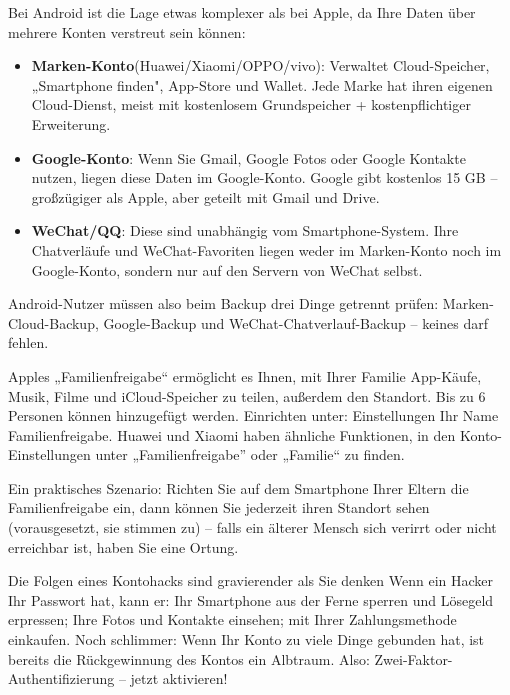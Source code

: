 
Bei Android ist die Lage etwas komplexer als bei Apple, da Ihre Daten über mehrere Konten verstreut sein können:

\begin{itemize}
  \item \textbf{Marken-Konto}(Huawei/Xiaomi/OPPO/vivo): Verwaltet Cloud-Speicher, „Smartphone finden", App-Store und Wallet. Jede Marke hat ihren eigenen Cloud-Dienst, meist mit kostenlosem Grundspeicher + kostenpflichtiger Erweiterung.
  \item \textbf{Google-Konto}: Wenn Sie Gmail, Google Fotos oder Google Kontakte nutzen, liegen diese Daten im Google-Konto. Google gibt kostenlos 15 GB – großzügiger als Apple, aber geteilt mit Gmail und Drive.
  \item \textbf{WeChat/QQ}: Diese sind unabhängig vom Smartphone-System. Ihre Chatverläufe und WeChat-Favoriten liegen weder im Marken-Konto noch im Google-Konto, sondern nur auf den Servern von WeChat selbst.
\end{itemize}

Android-Nutzer müssen also beim Backup drei Dinge getrennt prüfen: Marken-Cloud-Backup, Google-Backup und WeChat-Chatverlauf-Backup – keines darf fehlen.


Apples „Familienfreigabe“ ermöglicht es Ihnen, mit Ihrer Familie App-Käufe, Musik, Filme und iCloud-Speicher zu teilen, außerdem den Standort. Bis zu 6 Personen können hinzugefügt werden. Einrichten unter: Einstellungen Ihr Name Familienfreigabe. Huawei und Xiaomi haben ähnliche Funktionen, in den Konto-Einstellungen unter „Familienfreigabe” oder „Familie“ zu finden.

Ein praktisches Szenario: Richten Sie auf dem Smartphone Ihrer Eltern die Familienfreigabe ein, dann können Sie jederzeit ihren Standort sehen (vorausgesetzt, sie stimmen zu) – falls ein älterer Mensch sich verirrt oder nicht erreichbar ist, haben Sie eine Ortung.

\begin{tcbwarn}{Die Folgen eines Kontohacks sind gravierender als Sie denken}
Wenn ein Hacker Ihr Passwort hat, kann er: Ihr Smartphone aus der Ferne sperren und Lösegeld erpressen; Ihre Fotos und Kontakte einsehen; mit Ihrer Zahlungsmethode einkaufen. Noch schlimmer: Wenn Ihr Konto zu viele Dinge gebunden hat, ist bereits die Rückgewinnung des Kontos ein Albtraum. Also: Zwei-Faktor-Authentifizierung – jetzt aktivieren!

\end{tcbwarn}


